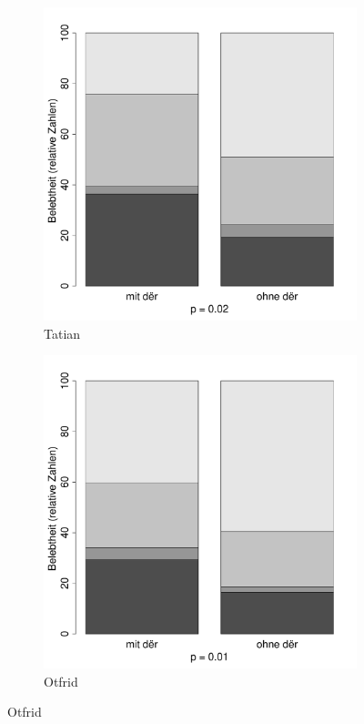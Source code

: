 \begin{figure}
\begin{subfigure}[b]{.5\linewidth}
  \includegraphics[height=.25\textheight]{generated/images/belebtheit-hapaxe-T}
\caption {Tatian}
\end{subfigure}%
\begin{subfigure}[b]{.5\linewidth}
  \includegraphics[height=.25\textheight]{generated/images/belebtheit-hapaxe-O}
\caption {Otfrid}
\end{subfigure}


\end{figure}
